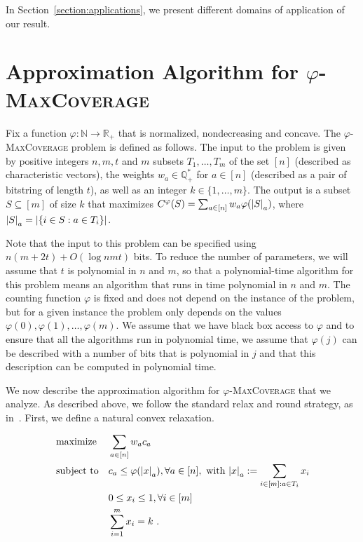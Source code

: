 In Section~\ref{section:applications}, we present different domains of application of our result.

\section{Approximation Algorithm for $\varphi$-\textsc{MaxCoverage}}
\label{section:ApproxAlgo}

Fix a function $\varphi : \mathbb{N} \to \mathbb{R}_+$ that is normalized, nondecreasing and concave. The $\varphi$-\textsc{MaxCoverage} problem is defined as follows. The input to the problem is given by positive integers $n,m,t$ and $m$ subsets $T_{1}, \dots, T_{m}$ of the set $[n]$ (described as characteristic vectors), the weights $w_a \in \mathbb{Q}_+^*$ for $a \in [n]$ (described as a pair of bitstring of length $t$), as well as an integer $k \in \{1, \dots, m\}$.  The output is a subset $S \subseteq [m]$ of size $k$ that maximizes $C^{\varphi}(S) = \sum_{a \in [n]} w_a \varphi(\abs{S}_a)$, where $\abs{S}_a = \abs{\{ i \in S : a \in T_i\}}$.

Note that the input to this problem can be specified using $n(m+2t) + O(\log nmt)$ bits. To reduce the number of parameters, we will assume that $t$ is polynomial in $n$ and $m$, so that a polynomial-time algorithm for this problem means an algorithm that runs in time polynomial in $n$ and $m$. The counting function $\varphi$ is fixed and does not depend on the instance of the problem, but for a given instance the problem only depends on the values $\varphi(0), \varphi(1), \dots, \varphi(m)$. We assume that we have black box access to $\varphi$ and to ensure that all the algorithms run in polynomial time, we assume that $\varphi(j)$ can be described with a number of bits that is polynomial in $j$ and that this description can be computed in polynomial time.

We now describe the approximation algorithm for $\varphi$-\textsc{MaxCoverage} that we analyze. As described above, we follow the standard relax and round strategy, as in~\cite{BFGG20}. First, we define a natural convex relaxation.
\begin{definition}
  \begin{equation}
    \begin{aligned}
      &\operatorname{\text{maximize}}&& \sum_{a \in [n]} w_ac_a \\
      &\operatorname{\text{subject to}}&& c_a \leq \varphi(\abs{x}_a), \forall a \in [n],\text{ with }\abs{x}_a := \sum_{i \in [m] : a \in T_i} x_i\\
      &&& 0 \leq x_i \leq 1, \forall i \in [m]\\
      &&& \sum_{i=1}^m x_i = k \ .
    \end{aligned}
  \end{equation}
  \label{defi:relaxedProg}
\end{definition}

